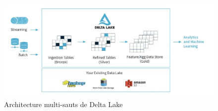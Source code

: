 \begin{figure}[H]
\centering
\includegraphics[width=\linewidth]{images/delta_lake_architecture.png}
\caption{Architecture multi-sauts de Delta Lake}\label{fig:delta-lake-architecture}
\end{figure}

